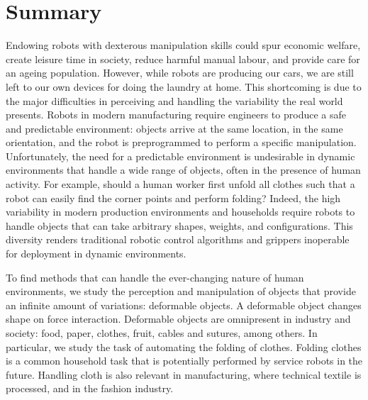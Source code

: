 \documentclass[\home/main.tex]{subfiles}
\begin{document}

\chapter{Summary}

Endowing robots with dexterous manipulation skills could spur economic welfare, create leisure time in society, reduce harmful manual labour, and provide care for an ageing population.
However, while robots are producing our cars, we are still left to our own devices for doing the laundry at home. This shortcoming is due to the major difficulties in perceiving and handling the variability the real world presents.
Robots in modern manufacturing require engineers to produce a safe and predictable environment: objects arrive at the same location, in the same orientation, and the robot is preprogrammed to perform a specific manipulation.
Unfortunately, the need for a predictable environment is undesirable in dynamic environments that handle a wide range of objects, often in the presence of human activity. For example, should a human worker first unfold all clothes such that a robot can easily find the corner points and perform folding?
Indeed, the high variability in modern production environments and households require robots to handle objects that can take arbitrary shapes, weights, and configurations. This diversity renders traditional robotic control algorithms and grippers inoperable for deployment in dynamic environments.

To find methods that can handle the ever-changing nature of human environments, we study the perception and manipulation of objects that provide an infinite amount of variations: deformable objects. A deformable object changes shape on force interaction. Deformable objects are omnipresent in industry and society: food, paper, clothes, fruit, cables and sutures, among others. In particular, we study the task of automating the folding of clothes. Folding clothes is a common household task that is potentially performed by service robots in the future. Handling cloth is also relevant in manufacturing, where technical textile is processed, and in the fashion industry.
\end{document}
